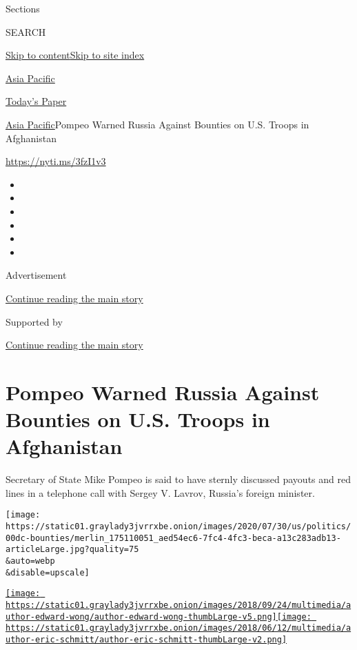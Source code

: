 Sections

SEARCH

\protect\hyperlink{site-content}{Skip to
content}\protect\hyperlink{site-index}{Skip to site index}

\href{https://www.nytimes3xbfgragh.onion/section/world/asia}{Asia
Pacific}

\href{https://myaccount.nytimes3xbfgragh.onion/auth/login?response_type=cookie\&client_id=vi}{}

\href{https://www.nytimes3xbfgragh.onion/section/todayspaper}{Today's
Paper}

\href{/section/world/asia}{Asia Pacific}\textbar{}Pompeo Warned Russia
Against Bounties on U.S. Troops in Afghanistan

\url{https://nyti.ms/3fzI1v3}

\begin{itemize}
\item
\item
\item
\item
\item
\item
\end{itemize}

Advertisement

\protect\hyperlink{after-top}{Continue reading the main story}

Supported by

\protect\hyperlink{after-sponsor}{Continue reading the main story}

\hypertarget{pompeo-warned-russia-against-bounties-on-us-troops-in-afghanistan}{%
\section{Pompeo Warned Russia Against Bounties on U.S. Troops in
Afghanistan}\label{pompeo-warned-russia-against-bounties-on-us-troops-in-afghanistan}}

Secretary of State Mike Pompeo is said to have sternly discussed payouts
and red lines in a telephone call with Sergey V. Lavrov, Russia's
foreign minister.

\texttt{[image: https://static01.graylady3jvrrxbe.onion/images/2020/07/30/us/politics/00dc-bounties/merlin\_175110051\_aed54ec6-7fc4-4fc3-beca-a13c283adb13-articleLarge.jpg?quality=75\\\&auto=webp\\\&disable=upscale]}

\href{https://www.nytimes3xbfgragh.onion/by/edward-wong}{\texttt{[image: https://static01.graylady3jvrrxbe.onion/images/2018/09/24/multimedia/author-edward-wong/author-edward-wong-thumbLarge-v5.png]}}\href{https://www.nytimes3xbfgragh.onion/by/eric-schmitt}{\texttt{[image: https://static01.graylady3jvrrxbe.onion/images/2018/06/12/multimedia/author-eric-schmitt/author-eric-schmitt-thumbLarge-v2.png]}}

